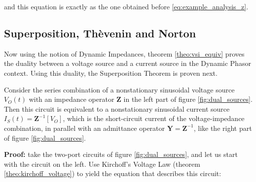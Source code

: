 \begin{example}
	\noindent and this equation is exactly as the one obtained before \eqref{eq:example_analysis_z}.

\examplebar
\end{example} %

\subsection{Superposition, Thèvenin and Norton} %

	Now using the notion of Dynamic Impedances, theorem \ref{theo:vsi_equiv} proves the duality between a voltage source and a current source in the Dynamic Phasor context. Using this duality, the Superposition Theorem is proven next.

\begin{theorem}\label{theo:vsi_equiv} %
	Consider the series combination of a nonstationary sinusoidal voltage source $V_O(t)$ with an impedance operator $\mathbf{Z}$ in the left part of figure \ref{fig:dual_sources}. Then this circuit is equivalent to a nonstationary sinusoidal current source $I_S(t) = \mathbf{Z}^{-1} \left[V_O\right]$, which is the short-circuit current of the voltage-impedance combination, in parallel with an admittance operator $\mathbf{Y} = \mathbf{Z}^{-1}$, like the right part of figure \ref{fig:dual_sources}.
\end{theorem} %
\textbf{Proof:} take the two-port circuits of figure \ref{fig:dual_sources}, and let us start with the circuit on the left. Use Kirchoff's Voltage Law (theorem \ref{theo:kirchoff_voltage}) to yield the equation that describes this circuit:

